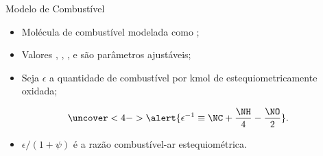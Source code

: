     \begin{frame}{Modelo de Combustível}\vspace*{-2em}
        \begin{itemize}
            \item<1-> Molécula de combustível \alert{modelada} como \alert{}; \\[\bigskipamount]
            \item<2-> Valores \alert{\NC}, \alert{\NH}, \alert{\NO}, e \alert{\NN} são
                \alert{parâmetros} ajustáveis; \\[\bigskipamount]
            \item<3-> Seja \alert{$\epsilon$} a quantidade de \alert{combustível por kmol de
                } estequiometricamente oxidada;
        \end{itemize}
        \vspace*{0.8em}\begin{equation*}
            \uncover<4->{
                \alert{\epsilon^{-1} \equiv \NC + \frac{\NH}{4} - \frac{\NO}{2}}.
            }
        \end{equation*}
        \vspace*{-0.8em}\begin{itemize}
            \item<5-> \alert{$\epsilon/(1+\psi)$} é a razão \alert{combustível-ar}
                estequiométrica.
        \end{itemize}
    \end{frame}

